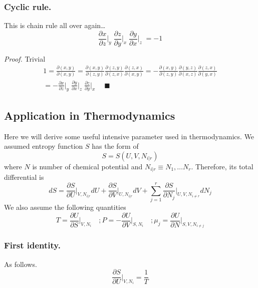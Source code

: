 \documentclass[../../../main.tex]{subfiles}
\begin{document}
\subsubsection{Cyclic rule.} This is chain rule all over again\dots
\begin{equation*}
    \frac{\partial x}{\partial z}\bigg|_y \;\frac{\partial z}{\partial y}\bigg|_x \; \frac{\partial y}{\partial x}\bigg|_z\;=-1
\end{equation*}

\emph{Proof.} Trivial
\begin{multline*}
    1=\frac{\partial (x,y)}{\partial (x,y)}=\frac{\partial (x,y)}{\partial (z,y)} \frac{\partial (z,y)}{\partial (z,x)} \frac{\partial (z,x)}{\partial (x,y)}
    =-\frac{\partial (x,y)}{\partial (z,y)} \frac{\partial (y,z)}{\partial (x,z)} \frac{\partial (z,x)}{\partial (y,x)}\\
    =-\frac{\partial x}{\partial z}\bigg|_y\;\frac{\partial y}{\partial x}\bigg|_z\;\frac{\partial z}{\partial y}\bigg|_x \;\quad\blacksquare
\end{multline*}

\subsection{Application in Thermodynamics}
Here we will derive some useful intensive parameter used in thermodynamics. We assumed entropy function $S$ has the form of
\begin{equation*}
    S=S(U, V, N_{i|r} )
\end{equation*}
where $N$ is number of chemical potential and $N_{i|r}\equiv N_1,\dots N_r$. Therefore, its total differential is
\begin{equation*}
    dS=\frac{\partial S}{\partial U}\bigg|_{V, N_{i|r} }dU + \frac{\partial S}{ \partial V}\bigg|_{U, N_{i|r} }dV +\sum_{j=1}^{r}\frac{\partial S}{ \partial N_j}\bigg|_{U,V, N_{i\neq r} }dN_j
\end{equation*}
We also assume the following quantities
\begin{equation*}
    T=\frac{\partial U}{\partial S}\bigg|_{V, N_{i} }\quad
    ;P=-\frac{\partial U}{\partial V}\bigg|_{S, N_{i} }\quad
    ;\mu_j=\frac{\partial U}{\partial N}\bigg|_{S, V, N_{i\neq j} }
\end{equation*}

\subsubsection{First identity.} As follows.
\begin{equation*}
    \frac{\partial S}{\partial U}\bigg|_{V, N_i}=\frac{1}{T}
\end{equation*}
\end{document}
